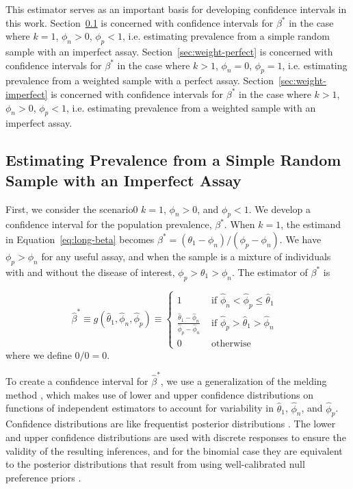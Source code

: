 \documentclass[AMA,STIX1COL]{WileyNJD-v2}
\begin{document}
This estimator serves as an important basis for developing confidence intervals in this work.
Section~\ref{sec:srs-imperfect} is concerned with confidence intervals for  \( \beta^* \) in the case where \( k = 1 \), \( \phi_n > 0 \), \( \phi_p < 1 \), i.e. estimating prevalence from a simple random sample with an imperfect assay.
Section~\ref{sec:weight-perfect} is concerned with confidence intervals for  \( \beta^* \) in the case where \( k > 1 \), \( \phi_n = 0 \), \( \phi_p = 1 \), i.e. estimating prevalence from a weighted sample with a perfect assay.
Section~\ref{sec:weight-imperfect} is concerned with confidence intervals for  \( \beta^* \) in the case where \( k > 1 \), \( \phi_n > 0 \), \( \phi_p < 1 \), i.e. estimating prevalence from a weighted sample with an imperfect assay.

\subsection{Estimating Prevalence from a Simple Random Sample with an Imperfect Assay}
\label{sec:srs-imperfect}

First, we consider the scenario0 \( k = 1 \), \( \phi_n > 0 \), and \( \phi_p < 1 \).
We develop a confidence interval for the population prevalence, \( \beta^* \).
When \( k = 1 \), the estimand in Equation~\ref{eq:long-beta} becomes $\beta^* = (\theta_1 - \phi_n)/(\phi_p-\phi_n)$. We have $\phi_p > \phi_n$ for any useful assay, and when the sample is a mixture of individuals with and without the disease of interest, $\phi_p > \theta_1 > \phi_n$. The estimator of $\beta^*$ is 

\begin{equation}
\hat{\beta}^* \equiv 
g(\hat{\theta}_1, \hat{\phi}_n, \hat{\phi}_p)
\equiv 
\left\{ 
\begin{array}{ll}
1 & \mbox{ if $\hat{\phi}_n < \hat{\phi}_p \leq \hat{\theta}_1$ }  \\
\frac{\hat{\theta}_1 - \hat{\phi}_n}{\hat{\phi}_p - \hat{\phi}_n} & 
\mbox{ if $\hat{\phi}_p > \hat{\theta}_1 > \hat{\phi}_n$ } \\
0 & \mbox{ otherwise} 
\end{array}
\right.
\label{eq:srs-beta-est}
\end{equation}
where we define $0/0=0$.



To create a confidence interval for \( \hat{\beta}^* \), we use a generalization of the melding method \cite{FayP:2015}, which makes use of lower and upper confidence distributions on functions of independent estimators to account for variability in \( \hat{\theta}_1 \), \( \hat{\phi}_n \), and \( \hat{\phi}_p \). Confidence distributions are like frequentist posterior distributions
\cite{}.  The lower and upper confidence distributions are used with discrete responses to ensure the validity of the resulting inferences, and for the binomial case they are equivalent to the posterior distributions that result from using well-calibrated null preference priors \cite{}.
\end{document}
